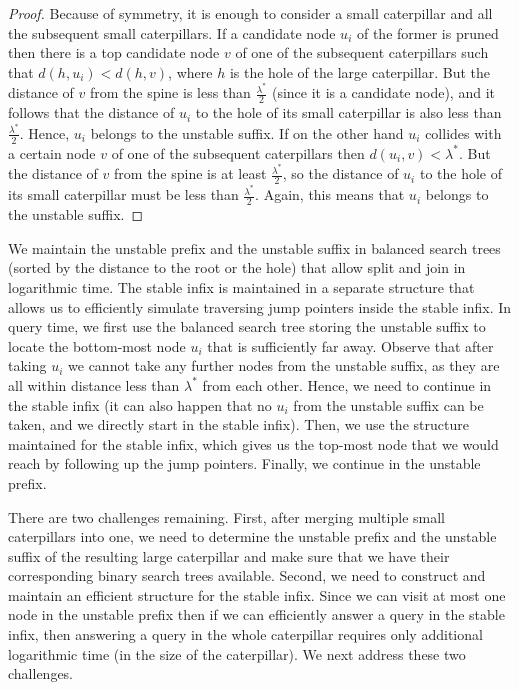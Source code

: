 \documentclass[a4paper,UKenglish]{lipics-v2016}
\theoremstyle{plain}
\begin{document}
\begin{proof}
Because of symmetry, it is enough to consider a small caterpillar and all the subsequent
small caterpillars. If a candidate node $u_{i}$ of the former is pruned then there is a top candidate node
$v$ of one of the subsequent caterpillars such that $d(h,u_{i}) < d(h,v)$, where $h$ is the hole
of the large caterpillar. But the distance of $v$ from the spine is less than $\frac{\lambda^{*}}{2}$ (since it is a candidate node),
 and it follows that the distance of $u_{i}$ to the hole of its small caterpillar is also less
than $\frac{\lambda^{*}}{2}$. Hence, $u_{i}$ belongs to the unstable suffix.
If on the other hand $u_{i}$ collides with a certain node $v$ of one of the subsequent
caterpillars then $d(u_{i},v)<\lambda^{*}$. But the distance of $v$ from the spine is at least
$\frac{\lambda^{*}}{2}$, so the distance of $u_{i}$ to the hole of its small caterpillar must be
less than $\frac{\lambda^{*}}{2}$. Again, this means that $u_{i}$ belongs to the unstable suffix.
\end{proof}

We maintain the unstable prefix and the unstable suffix  in balanced search
trees (sorted by the distance to the root or the hole) that allow split and join in logarithmic time.
The stable infix is maintained in a separate structure that allows us to efficiently simulate traversing jump pointers inside the stable infix. 
%
In query time, we first use the balanced search tree storing the unstable suffix to locate the bottom-most node
$u_{i}$ that is sufficiently far away. Observe that after taking $u_{i}$ we cannot
take any further nodes from the unstable suffix, as they are all within distance less than
$\lambda^{*}$ from each other. Hence, we need to continue in the stable infix (it can also
happen that no $u_{i}$ from the unstable suffix can be taken, and we directly start in the stable
infix). Then, we use the structure maintained for the stable infix, which gives us the top-most
node that we would reach by following up the jump pointers. Finally, we  continue in the unstable prefix. 

There are two challenges remaining. First, after merging multiple small caterpillars into one, we need to determine the unstable
prefix and the unstable suffix of the resulting large caterpillar and make sure that we have
their corresponding binary search trees available.
Second, we need to construct and maintain an efficient structure for the stable infix. Since we can visit at most one node in the unstable prefix then if we can efficiently answer a query in the stable infix, then answering a query in
the whole caterpillar requires only additional logarithmic time (in the size of the caterpillar).
We next address these two challenges.
\end{document}
